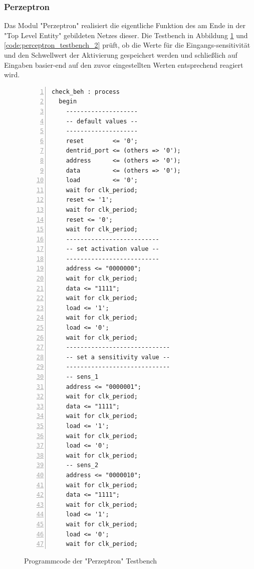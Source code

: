 \documentclass{article}
\numberwithin{equation}{section}
\begin{document}
\subsubsection{Perzeptron}
Das Modul "Perzeptron" realisiert die eigentliche Funktion des am Ende in der "Top Level 
Entity" gebildeten Netzes dieser. Die Testbench in Abbildung \ref{code:perceptron_testbench_1}
und \ref{code:perceptron_testbench_2} prüft, ob die Werte für die Eingangs-sensitivität
und den Schwellwert der Aktivierung gespeichert werden und schließlich auf Eingaben
basier-end auf den zuvor eingestellten Werten entsprechend reagiert wird.
\begin{figure}[htbp]
    \begin{lstlisting}[style=VHDL,numbers=left,stepnumber=1,style=myCustomMatlabStyle,basicstyle=\footnotesize]
check_beh : process
  begin
    --------------------
    -- default values --
    --------------------
    reset        <= '0';
    dentrid_port <= (others => '0');
    address      <= (others => '0');
    data         <= (others => '0');
    load         <= '0';
    wait for clk_period;
    reset <= '1';
    wait for clk_period;
    reset <= '0';
    wait for clk_period;
    --------------------------
    -- set activation value --
    --------------------------
    address <= "0000000";
    wait for clk_period;
    data <= "1111";
    wait for clk_period;
    load <= '1';
    wait for clk_period;
    load <= '0';
    wait for clk_period;
    -----------------------------
    -- set a sensitivity value --
    -----------------------------
    -- sens_1
    address <= "0000001";
    wait for clk_period;
    data <= "1111";
    wait for clk_period;
    load <= '1';
    wait for clk_period;
    load <= '0';
    wait for clk_period;
    -- sens_2
    address <= "0000010";
    wait for clk_period;
    data <= "1111";
    wait for clk_period;
    load <= '1';
    wait for clk_period;
    load <= '0';
    wait for clk_period;
\end{lstlisting}
\caption{Programmcode der "Perzeptron" Testbench} \label{code:perceptron_testbench_1}
\end{figure}
\FloatBarrier
\end{document}
